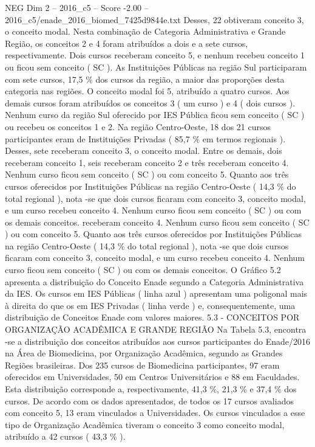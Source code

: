 \begin{textsample}{NEG Dim 2 – 2016\_c5 – Score -2.00 – 2016\_c5/enade\_2016\_biomed\_7425d9844e.txt}
Desses, 22 obtiveram conceito 3, o conceito modal.
Nesta combinação de Categoria Administrativa e Grande Região, os conceitos 2 e 4 foram atribuídos a dois e a sete cursos, respectivamente.
Dois cursos receberam conceito 5, e nenhum recebeu conceito 1 ou ficou sem conceito ( SC ).
As Instituições Públicas na região Sul participaram com sete cursos, 17,5 \% dos cursos da região, a maior das proporções desta categoria nas regiões.
O conceito modal foi 5, atribuído a quatro cursos.
Aos demais cursos foram atribuídos os conceitos 3 ( um curso ) e 4 ( dois cursos ).
Nenhum curso da região Sul oferecido por IES Pública ficou sem conceito ( SC ) ou recebeu os conceitos 1 e 2.
Na região Centro-Oeste, 18 dos 21 cursos participantes eram de Instituições Privadas ( 85,7 \% em termos regionais ).
Desses, sete receberam conceito 3, o conceito modal.
Entre os demais, dois receberam conceito 1, seis receberam conceito 2 e três receberam conceito 4.
Nenhum curso ficou sem conceito ( SC ) ou com conceito 5.
Quanto aos três cursos oferecidos por Instituições Públicas na região Centro-Oeste ( 14,3 \% do total regional ), nota -se que dois cursos ficaram com conceito 3, conceito modal, e um curso recebeu conceito 4.
Nenhum curso ficou sem conceito ( SC ) ou com os demais conceitos. receberam conceito 4.
Nenhum curso ficou sem conceito ( SC ) ou com conceito 5.
Quanto aos três cursos oferecidos por Instituições Públicas na região Centro-Oeste ( 14,3 \% do total regional ), nota -se que dois cursos ficaram com conceito 3, conceito modal, e um curso recebeu conceito 4.
Nenhum curso ficou sem conceito ( SC ) ou com os demais conceitos.
O Gráfico 5.2 apresenta a distribuição do Conceito Enade segundo a Categoria Administrativa da IES.
Os cursos em IES Públicas ( linha azul ) apresentam uma poligonal mais à direita do que os em IES Privadas ( linha verde ) e, consequentemente, uma distribuição de Conceitos Enade com valores maiores. 5.3 - CONCEITOS POR ORGANIZAÇÃO ACADÊMICA E GRANDE REGIÃO Na Tabela 5.3, encontra -se a distribuição dos conceitos atribuídos aos cursos participantes do Enade/2016 na Área de Biomedicina, por Organização Acadêmica, segundo as Grandes Regiões brasileiras.
Dos 235 cursos de Biomedicina participantes, 97 eram oferecidos em Universidades, 50 em Centros Universitários e 88 em Faculdades.
Esta distribuição corresponde a, respectivamente, 41,3 \%, 21,3 \% e 37,4 \% dos cursos.
De acordo com os dados apresentados, de todos os 17 cursos avaliados com conceito 5, 13 eram vinculados a Universidades.
Os cursos vinculados a esse tipo de Organização Acadêmica tiveram o conceito 3 como conceito modal, atribuído a 42 cursos ( 43,3 \% ).

\end{textsample}
